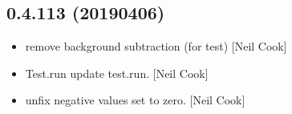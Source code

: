 \documentclass[a4paper,10pt,english]{report}
\begin{document}
\subsection{0.4.113 (2019\sphinxhyphen{}04\sphinxhyphen{}06)}
\label{\detokenize{misc/changelog:id166}}\begin{itemize}
\item {} 
 \sphinxhyphen{} remove background subtraction (for test) {[}Neil
Cook{]}

\item {} 
Test.run \sphinxhyphen{} update test.run. {[}Neil Cook{]}

\item {} 
 \sphinxhyphen{} unfix negative values set to zero. {[}Neil Cook{]}

\end{itemize}
\end{document}
